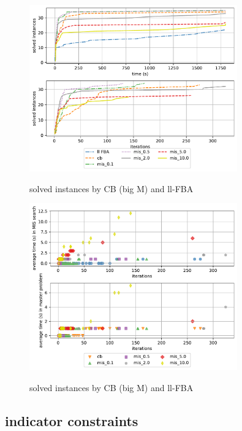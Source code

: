\begin{figure}[h!]
    \caption{solved instances by CB (big M) and ll-FBA}
    \centering
    \includegraphics[width=0.8\textwidth]{Images/mis_comparison_solved_instances_big_m.pdf}
    \label{fig:mis_comparison_solved_instances_big_m}
\end{figure}

\begin{figure}[h!]
    \caption{solved instances by CB (big M) and ll-FBA}
    \centering
    \includegraphics[width=0.8\textwidth]{Images/mis_comparison_time_vs_iterations_big_m.pdf}
    \label{fig:mis_comparison_time_vs_iterations_big_m}
\end{figure}




\subsection{indicator constraints}